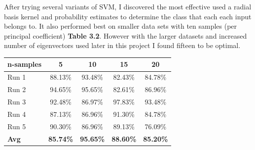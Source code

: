 After trying several variants of SVM, I discovered the most effective used a radial basis kernel and probability estimates to determine the class that each each input belongs to.
It also performed best on smaller data sets with ten samples (per principal coefficient) {\bf Table 3.2}. However with the larger datasets and increased number of eigenvectors used later in this project I found fifteen to be optimal.

\begin{table}[h]
\begin{center}
    \begin{tabular}{ | l | c  | c | c | c |}
    \hline
    n-samples & 5 & 10 & 15 & 20\\ \hline
    Run 1 & 88.13\% & 93.48\% & 82.43\% & 84.78\%\\ \hline
    Run 2 & 94.65\% & 95.65\% & 82.61\% & 86.96\%\\ \hline
    Run 3 & 92.48\% & 86.97\% & 97.83\% & 93.48\%\\ \hline
    Run 4 & 87.13\% & 86.96\% & 91.30\% & 84.78\%\\ \hline
    Run 5 & 90.30\% & 86.96\% & 89.13\% & 76.09\%\\ \hline
    \textbf{Avg}   & \textbf{85.74\%} & \textbf{95.65\%} & \textbf{88.60\%} & \textbf{85.20\%}\\ \hline
    \end{tabular}
\end{center}
\end{table}

